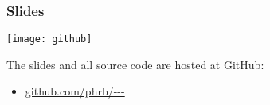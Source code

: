 \begin{frame}
    \frametitle{Slides}
    \begin{center}
        \texttt{[image: github]}
    \end{center}
    The slides and all source code are hosted at \alert{GitHub}:

    \begin{itemize}
        \item \url{github.com/phrb/---}
    \end{itemize}
\end{frame}

